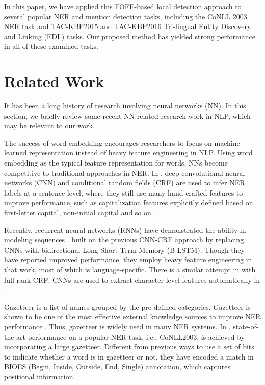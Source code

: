\documentclass[11pt,a4paper]{article}
\begin{document}
In this paper, we have applied this FOFE-based local detection approach to several popular NER and mention detection tasks, including the CoNLL 2003 NER task and 
TAC-KBP2015 and TAC-KBP2016 Tri-lingual Entity Discovery and Linking (EDL) tasks.
Our proposed method has yielded strong performance in all of these examined tasks. 

\section{Related Work}
\label{sec_related_work}

It has been a long history of research involving neural networks (NN). In this section, we briefly review some recent NN-related research work in NLP, which may be relevant to our work. 

The success of word embedding \cite{mikolov2013distributed} encourages researchers to focus on machine-learned representation instead of heavy feature engineering in NLP. Using word embedding as the typical feature representation for words, NNs become competitive to traditional approaches in NER. 
In \cite{collobert2011natural}, 
deep convolutional neural networks (CNN) and conditional random fields (CRF) are used to infer NER labels at a sentence level, where they still use many hand-crafted features to improve performance, such as capitalization features explicitly defined based on first-letter capital, non-initial capital and so on.

Recently, recurrent neural networks (RNNs) have demonstrated the ability in modeling sequences \cite{graves2012neural}. 
 built on the previous CNN-CRF approach by replacing CNNs with bidirectional Long Short-Term Memory (B-LSTM). 
Though they have reported improved performance, they employ heavy feature engineering in that work, most of which is language-specific. There is a similar attempt in \cite{rondeau2016lstm} with full-rank CRF. 
CNNs are used to extract character-level features automatically in \cite{dos2015boosting}. 

Gazetteer is a list of names grouped by the pre-defined categories.
Gazetteer is shown to be one of the most effective external knowledge sources to improve NER performance \cite{tjong2003introduction}. Thus, gazetteer is widely used in many NER systems.  
In \cite{chiu2016named}, state-of-the-art performance on a popular NER task, i.e., CoNLL2003,  is achieved by incorporating  a large gazetteer. 
Different from previous ways to use a set of bits to indicate whether a word is in gazetteer or not, 
they have encoded a match in BIOES (Begin, Inside, Outside, End, Single) annotation, 
which captures positional information. 
\end{document}
